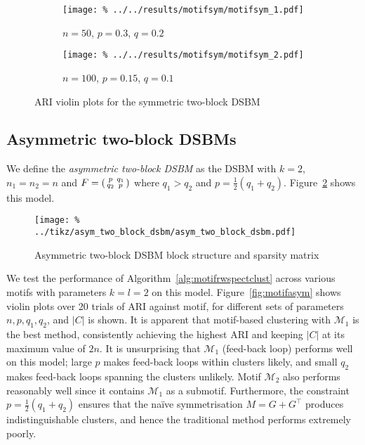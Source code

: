\documentclass[12pt]{ociamthesis}
\theoremstyle{plain}
\theoremstyle{definition}
\theoremstyle{remark}
\newcommand\ca[1]{\mathcal{#1}}
\begin{document}
\begin{figure}[H]
  \begin{subfigure}{.49\textwidth}
    \centering
    \texttt{[image: \%
    ../../results/motifsym/motifsym\_1.pdf]}
    \caption{$n=50$, $p=0.3$, $q=0.2$}
  \end{subfigure}
  \begin{subfigure}{.49\textwidth}
    \centering
    \texttt{[image: \%
    ../../results/motifsym/motifsym\_2.pdf]}
    \caption{$n=100$, $p=0.15$, $q=0.1$}
  \end{subfigure}
  \caption{ARI violin plots for the symmetric two-block DSBM}
  \label{fig:motifsym}
\end{figure}

\subsection{Asymmetric two-block DSBMs} \label{sec:motif_asymm_dsbms}

We define the \emph{asymmetric two-block DSBM} as the DSBM with $k=2$,
$n_1=n_2=n$ and
$F =
\begin{psmallmatrix}
  p & q_1 \\ q_2 & p
\end{psmallmatrix}$
where $q_1 > q_2$ and $p = \frac{1}{2}(q_1+q_2)$.
Figure~\ref{fig:asym_two_block_dsbm} shows this model.

\begin{figure}[H]
  \centering
  \texttt{[image: \%
  ../tikz/asym\_two\_block\_dsbm/asym\_two\_block\_dsbm.pdf]}
  \caption{Asymmetric two-block DSBM block structure and sparsity matrix}
  \label{fig:asym_two_block_dsbm}
\end{figure}

We test the performance of Algorithm~\ref{alg:motifrwspectclust} across various
motifs with parameters $k=l=2$ on this model.
Figure~\ref{fig:motifasym} shows violin plots over 20 trials of ARI against
motif, for different sets of parameters $n,p,q_1,q_2$, and $|C|$ is shown.
It is apparent that motif-based clustering with $\ca{M}_1$ is the best method,
consistently achieving the highest ARI and keeping $|C|$ at its maximum value
of $2n$.
It is unsurprising that $\ca{M}_1$ (feed-back loop) performs well on this
model; large $p$ makes feed-back loops within clusters likely, and small $q_2$
makes feed-back loops spanning the clusters unlikely. Motif $\ca{M}_2$ also
performs reasonably well since it contains $\ca{M}_1$ as a submotif.
Furthermore, the constraint $p = \frac{1}{2}(q_1+q_2)$ ensures that the na\"ive
symmetrisation $M=G+G^\top$ produces indistinguishable clusters, and hence the
traditional method performs extremely poorly.
\end{document}
